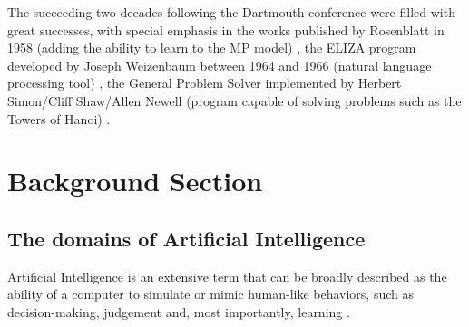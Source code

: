 \documentclass[12pt]{article}
\begin{document}
\par The succeeding two decades following the Dartmouth conference were filled with great successes, with special emphasis in the works published by Rosenblatt in 1958 (adding the ability to learn to the MP model) \autocite{liSurveyConvolutionalNeural2020}, the ELIZA program developed by Joseph Weizenbaum between 1964 and 1966 (natural language processing tool) \autocite{haenleinBriefHistoryArtificial2019,weizenbaumELIZAComputerProgram1966}, the General Problem Solver implemented by Herbert Simon/Cliff Shaw/Allen Newell (program capable of solving problems such as the Towers of Hanoi) \autocite{universityReportGeneralProblemSolving}.





\section{Background Section}



\subsection{The domains of Artificial Intelligence}
Artificial Intelligence is an extensive term that can be broadly described as the ability of a computer to simulate or mimic human-like behaviors, such as decision-making, judgement and, most importantly, learning \autocite{zhangStudyArtificialIntelligence2021}.

\newpage
\printbibliography
\end{document}
